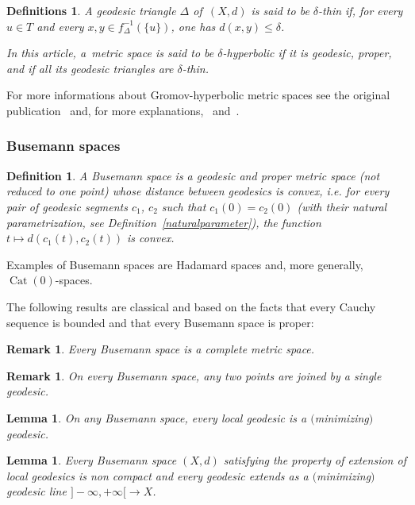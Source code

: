 \documentclass[10pt,a4paper]{amsart}
\numberwithin{equation}{section}
\newtheorem{Lemma}[theor]{Lemma}
\newtheorem{defi}[theor]{Definition}
\newtheorem{defis}[theor]{Definitions}
\newtheorem{Remark}[theor]{Remark}
\newcommand{\Cat}{\operatorname{Cat}}
\begin{document}
\begin{defis}\label{hypdefinition0}
A geodesic triangle $\Delta$ of~$(X,d)$ is said to be $\delta$-thin if, for every $u \in T$ and every $x, y \in f_\Delta^{-1} (\{u\})$, one has $d(x,y) \le
\delta$.

In this article, a~metric space is said to be $\delta$-hyperbolic if it is geodesic, proper, and if all its geodesic triangles are $\delta$-thin.
\end{defis}

For more informations about Gromov-hyperbolic metric spaces see the original publication~\cite{Gr4} and, for more explanations,~\cite{CDP,GH} and~\cite{BH}.

\subsubsection{Busemann spaces}\label{Busemannspaces}

\begin{defi}%
A Busemann space is a geodesic and proper metric space (not reduced to one point) whose distance between geodesics is convex, i.e. for every pair
 of geodesic segments $c_1$, $c_2 $ such that $c_1 (0) = c_2 (0)$ (with their natural parametrization, see Definition~\ref{naturalparameter}),
the
function $t \mapsto d(c_1(t), c_2 (t))$ is convex.
\end{defi}

Examples of Busemann spaces are Hadamard spaces and, more generally, $\Cat (0)$-spaces.

\medskip

The following results are classical and based on the facts that every Cauchy sequence is bounded and that every Busemann space is proper:

\begin{Remark}%
Every Busemann space is a complete metric space.
\end{Remark}

\begin{Remark}%
On every Busemann space, any two points are joined by a single geodesic.
\end{Remark}

\begin{Lemma}%
On any Busemann space, every local geodesic is a $($minimizing$)$ geodesic.
\end{Lemma}

\begin{Lemma}%
Every Busemann space $(X,d)$ satisfying the property of extension of local geo\-de\-sics is non compact and every geo\-de\-sic extends as
a $($minimizing$)$ geodesic line $ ]{-} \infty, +\infty [ {}\to X$.
\end{Lemma}
\end{document}
